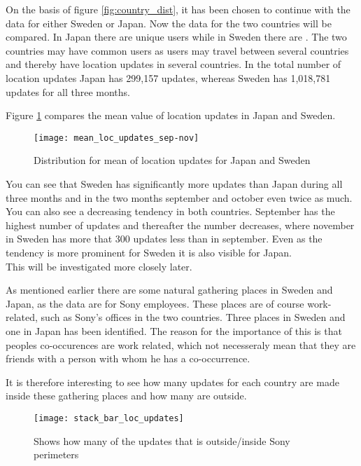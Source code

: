 On the basis of figure \ref{fig:country_dist}, it has been chosen to continue with the data for either Sweden or Japan. Now the data for the two countries will be compared. 
In Japan there are \numberUsersJapan{} unique users while in Sweden there are \numberUsersSweden. The two countries may have common users as users may travel between several countries and thereby have location updates in several countries.  
In the total number of location updates Japan has 299,157 updates, whereas Sweden has 1,018,781 updates for all three months. 

Figure \ref{fig:mean_loc_updates_sep-nov} compares the mean value of location updates in Japan and Sweden. 

\begin{figure}[H]
    \hspace*{-2.2cm}
    \centering
    \texttt{[image: mean\_loc\_updates\_sep-nov]}
    \caption{Distribution for mean of location updates for Japan and Sweden}
    \label{fig:mean_loc_updates_sep-nov}
\end{figure}


You can see that Sweden has significantly more updates than Japan during all three months and in the two months september and october even twice as much. You can also see a decreasing tendency in both countries. September has the highest number of updates and thereafter the number decreases, where november in Sweden has more that 300 updates less than in september. Even as the tendency is more prominent for Sweden it is also visible for Japan.  \\
This will be investigated more closely later.  


As mentioned earlier there are some natural gathering places in Sweden and Japan, as the data are for Sony employees. These places are of course work-related, such as Sony's offices in the two countries. Three places in Sweden and one in Japan has been identified. The reason for the importance of this is that peoples co-occurences are work related, which not necesseraly mean that they are friends with a person with whom he has a co-occurrence. 

It is therefore interesting to see how many updates for each country are made inside these gathering places and how many are outside.  

\begin{figure}[H]
    \hspace*{-2.2cm}
    \centering
    \texttt{[image: stack\_bar\_loc\_updates]}
    \caption{Shows how many of the updates that is outside/inside Sony perimeters}
    \label{fig:hq_stack_bar}
\end{figure}


